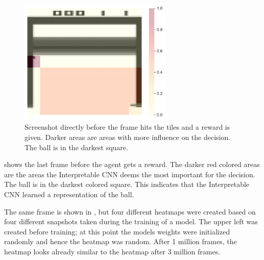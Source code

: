 \begin{figure}[ht!]
    \centering
    \includegraphics[width=0.65\textwidth]{plots/heatmaps/breakout_heatmap_before_reward.pdf}
    \caption{Screenshot directly before the frame hits the tiles and a reward is given. Darker areas are areas with more influence on the decision. The ball is in the darkest square.}
    \label{fig:heatmap_before_reward}
\end{figure}

 shows the last frame before the agent gets a reward. The darker red colored areas are the areas the Interpretable CNN deems the most important for the decision. The ball is in the darkest colored square. This indicates that the Interpretable CNN learned a representation of the ball.

The same frame is shown in , but four different heatmaps were created based on four different snapshots taken during the training of a model. The upper left was created before training; at this point the models weights were initialized randomly and hence the heatmap was random. After 1 million frames, the heatmap looks already similar to the heatmap after 3 million frames.

